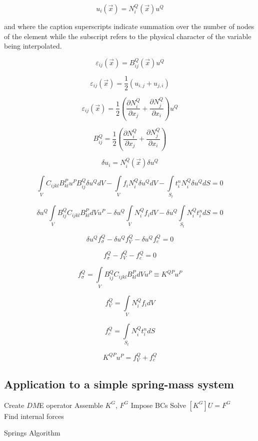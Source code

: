 \begin{equation} \label{bas_interpol}
{u_i}(\vec x) = N_i^Q(\vec x){u^Q}
\end{equation}

and where the caption superscripts indicate summation over the number of nodes of the element while the subscript refers to the physical character of the variable being interpolated.

\[{\varepsilon _{ij}}(\vec x) = B_{ij}^Q(\vec x){u^Q}\]

\[{\varepsilon _{ij}}(\vec x) = \frac{1}{2}\left( {{u_{i,j}} + {u_{j,i}}} \right)\]


\[{\varepsilon _{ij}}(\vec x) = \frac{1}{2}\left( {\frac{{\partial N_i^Q}}{{\partial {x_j}}} + \frac{{\partial N_j^Q}}{{\partial {x_i}}}} \right){u^Q}\]

\[B_{ij}^Q = \frac{1}{2}\left( {\frac{{\partial N_i^Q}}{{\partial {x_j}}} + \frac{{\partial N_j^Q}}{{\partial {x_i}}}} \right)\]

\[\delta {u_i} = N_i^Q(\vec x)\delta {u^Q}\]

\[\int\limits_V {{C_{ijkl}}B_{kl}^P{u^P}B_{ij}^Q\delta {u^Q}dV - \int\limits_V {{f_i}N_i^Q\delta {u^Q}dV}  - \int\limits_{{S_t}} {t_i^nN_i^Q\delta {u^Q}dS = 0} } \]

\[\delta {u^Q}\int\limits_V {B_{ij}^Q{C_{ijkl}}B_{kl}^PdV{u^P} - \delta {u^Q}\int\limits_V {N_i^Q{f_i}dV}  - \delta {u^Q}\int\limits_{{S_t}} {N_i^Qt_i^ndS = 0} } \]

\[\delta {u^Q}f_\sigma ^Q - \delta {u^Q}f_V^Q - \delta {u^Q}f_c^Q = 0\]

\[f_\sigma ^Q - f_V^Q - f_c^Q = 0\]

\[f_\sigma ^Q = \int\limits_V {B_{ij}^Q{C_{ijkl}}B_{kl}^PdV{u^P} \equiv {K^{QP}}} {u^P}\]

\[f_V^Q = \int\limits_V {N_i^Q{f_i}dV} \]

\[f_c^Q = \int\limits_{{S_t}} {N_i^Qt_i^ndS} \]

\[{K^{QP}}{u^P} = f_V^Q + f_c^Q\]

\subsection*{Application to a simple spring-mass system}


\begin{algorithm}[H]
 \SetAlgoLined
 Create $DM$E operator\;
 Assemble $K^G$, $F^G$\;
Impose BCs\;
Solve $[K^G]U=F^G$\\
Find internal forces
\caption{Springs Algorithm}
\end{algorithm}


